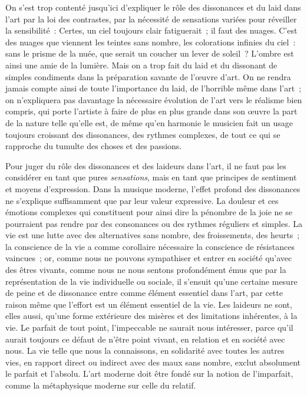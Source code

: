\documentclass[french,twoside]{book} %
\begin{document}
On s’est trop contenté jusqu’ici d’expliquer le rôle des dissonances et du laid dans l’art par la loi des contrastes, par la nécessité de sensations variées pour réveiller la sensibilité : Certes, un ciel toujours clair fatiguerait ; il faut des nuages. C’est des nuages que viennent les teintes sans nombre, les colorations infinies du ciel : sans le prisme de la nuée, que serait un coucher un lever de soleil ? L’ombre est ainsi une amie de la lumière. Mais on a trop fait du laid et du dissonant de simples condiments dans la préparation savante de l’œuvre d’art. On ne rendra jamais compte ainsi de toute l’importance du laid, de l’horrible même dans l’art ; on n’expliquera pas davantage la nécessaire évolution de l’art vers le réalisme bien compris, qui porte l’artiste à faire de plus en plus grande dans son œuvre la part de la nature telle qu’elle est, de même qu’en harmonie le musicien fait un usage toujours croissant des dissonances, des rythmes complexes, de tout ce qui se rapproche du tumulte des choses et des passions.\par
Pour juger du rôle des dissonances et des laideurs dans l’art, il ne faut pas les considérer en tant que pures \emph{sensations}, mais en tant que principes de sentiment et moyens d’expression. Dans la musique moderne, l’effet profond des dissonances ne s’explique suffisamment que par leur valeur expressive. La douleur et ces émotions complexes qui constituent pour ainsi dire la pénombre de la joie ne se pourraient pas rendre par des consonances ou des rythmes réguliers et simples. La vie est une lutte avec des alternatives sans nombre, des froissements, des heurts ; la conscience de la vie a comme corollaire nécessaire la conscience de résistances vaincues ; or, comme nous ne pouvons sympathiser et entrer en société qu’avec des êtres vivants, comme nous ne nous sentons profondément émus que par la représentation de la vie individuelle ou sociale, il s’ensuit qu’une certaine mesure de peine et de dissonance entre comme élément essentiel dans l’art, par cette raison même que l’effort est un élément essentiel de la vie. Les laideurs ne sont, elles aussi, qu’une forme extérieure des misères et des limitations inhérentes, à la vie. Le parfait de tout point, l’impeccable ne saurait nous intéresser, parce qu’il aurait toujours ce défaut de n’être point vivant, en relation et en société avec nous. La vie telle que nous la connaissons, en solidarité avec toutes les autres vies, en rapport direct ou indirect avec des maux sans nombre, exclut absolument le parfait et l’absolu. L’art moderne doit être fondé sur la notion de l’imparfait, comme la métaphysique moderne sur celle du relatif.\par
\end{document}
